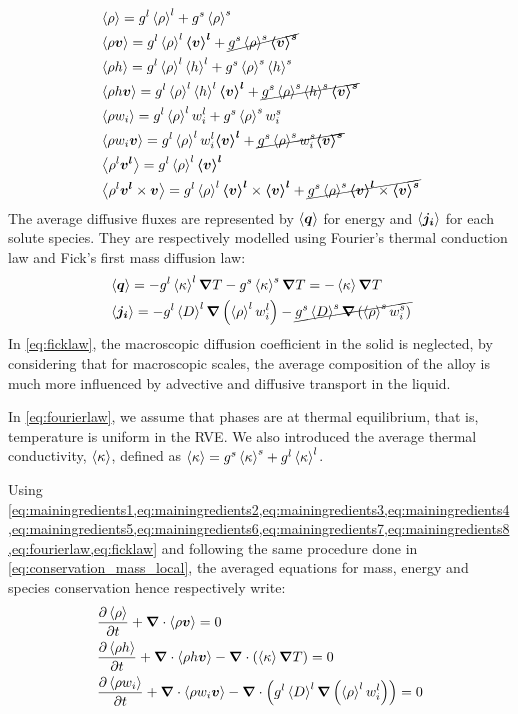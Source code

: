 \begin{align}
\label{eq:mainingredients1}
& \avg{\rho} = \gl \rhol + \gs \rhos \\
\label{eq:mainingredients2}
& \avg{\rho \vec{v}} = \gl \rhol \vl + \cancel{\gs \rhos \vs} \\
\label{eq:mainingredients3}
& \avg{\rho h} = \gl \rhol \hl + \gs \rhos \hs \\
\label{eq:mainingredients4}
& \avg{\rho h \vec{v}} = \gl \rhol \hl \vl + \cancel{\gs \rhos \hs \vs} \\
\label{eq:mainingredients5}
& \avg{\rho w_i} = \gl \rhol \wil + \gs \rhos \wis \\
\label{eq:mainingredients6}
& \avg{\rho w_i \vec{v}} = \gl \rhol \wil \vl + \cancel{\gs \rhos \wis \vs} \\
\label{eq:mainingredients7}
& \avg{\rho^l \vec{v^l}} = \gl \rhol \vl \\
\label{eq:mainingredients8}
& \avg{\rho^l \vec{v^l} \times \vec{v}} = \gl \rhol \vl \times \vl + \cancel{\gs \rhos \vl \times \vs}
\end{align}
The average diffusive fluxes are represented by $\left \langle \boldsymbol{q} \right \rangle$ for energy and $\left \langle \boldsymbol{j_i} \right \rangle$ for each solute species.
They are respectively modelled using Fourier's thermal conduction law and Fick's first mass diffusion law:
\begin{align}
\label{eq:fourierlaw}
& \avg{\vec{q}} = - \gl \kl \nabvec T -  \gs \ks \nabvec T = -\avg{\kappa} \nabvec T \\
\label{eq:ficklaw}
& \avg{\vec{j_i}} = - \gl \Dl \nabvec \brac{\rhol \wil} - \cancel{\gs \Ds \nabvec \brac{\rhos \wis}}
\end{align}
In \cref{eq:ficklaw}, the macroscopic diffusion coefficient in the solid is neglected, 
by considering that for macroscopic scales, the average composition of the alloy is much more influenced by advective 
and diffusive transport in the liquid.

In \cref{eq:fourierlaw}, we assume that phases are at thermal equilibrium, that is, temperature is uniform in the RVE.
We also introduced the average thermal conductivity, $\left \langle \kappa \right \rangle$, defined as $\left \langle \kappa \right \rangle={g^s} \left \langle \kappa \right \rangle^s + {g^l} \left \langle \kappa \right \rangle^l$.

Using \cref{eq:mainingredients1,eq:mainingredients2,eq:mainingredients3,eq:mainingredients4,eq:mainingredients5,eq:mainingredients6,eq:mainingredients7,eq:mainingredients8,eq:fourierlaw,eq:ficklaw}
and following the same procedure done in \cref{eq:conservation_mass_local}, the averaged equations for mass, energy and species conservation hence respectively write:
\begin{align}
\label{eq:conservation_mass}
& \frac{\partial \avg{\rho}}{\partial t} + \nabvec \cdot \avg{\rho \vec{v}} = 0 \\
\label{eq:conservation_energy_init}
& \frac{\partial \avg{\rho h}}{\partial t} + \nabvec \cdot \avg{\rho h \vec{v}} - \nabvec \cdot \brac{\avg{\kappa} \nabvec T} = 0 \\
\label{eq:conservation_solute_init}
& \frac{\partial \avg{\rho w_i}}{\partial t} + \nabvec \cdot \avg{\rho w_i \vec{v}} - \nabvec \cdot \brac{\gl \Dl \nabvec \brac{\rhol \wil}}= 0
\end{align}

